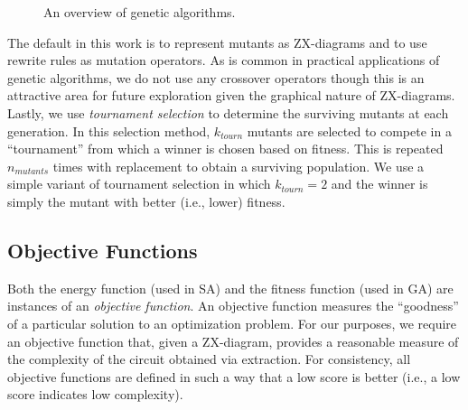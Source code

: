 \begin{figure}
\centering
{}
\caption{An overview of genetic algorithms.}
\label{fig:ga}
\end{figure}

The default in this work is to represent mutants as ZX-diagrams and to use rewrite rules as mutation operators.
As is common in practical applications of genetic algorithms, we do not use any crossover operators though this is an attractive area for future exploration given the graphical nature of ZX-diagrams. %
Lastly, we use \emph{tournament selection} to determine the surviving mutants at each generation.
In this selection method, $k_{tourn}$ mutants are selected to compete in a ``tournament'' from which a winner is chosen based on fitness.
This is repeated $n_{mutants}$ times with replacement to obtain a surviving population.
We use a simple variant of tournament selection in which $k_{tourn} = 2$ and the winner is simply the mutant with better (i.e., lower) fitness.


\subsection{Objective Functions}\label{sec:obj-funcs}


Both the energy function (used in SA) and the fitness function (used in GA) are instances of an \emph{objective function}.
An objective function measures the ``goodness'' of a particular solution to an optimization problem.
For our purposes, we require an objective function that, given a ZX-diagram, provides a reasonable measure of the complexity of the circuit obtained via extraction.
For consistency, all objective functions are defined in such a way that a low score is better (i.e., a low score indicates low complexity).

